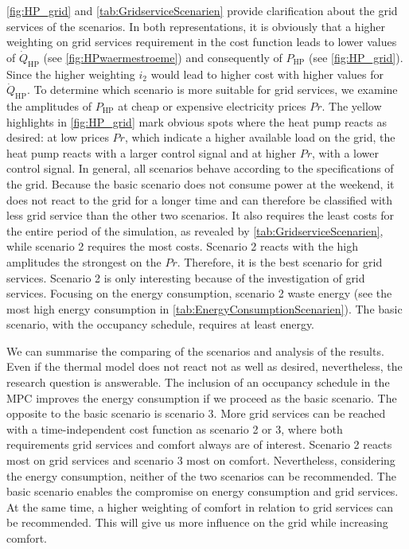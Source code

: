 \autoref{fig:HP_grid} and \autoref{tab:GridserviceScenarien} provide clarification about the grid services of the scenarios. In both representations, it is obviously that a higher weighting on grid services requirement in the cost function leads to lower values of $\dot{Q}_\text{HP}$ (see \autoref{fig:HPwaermestroeme}) and consequently of $P_\text{HP}$ (see \autoref{fig:HP_grid}). Since the higher weighting $i_\text{2}$ would lead to higher cost with higher values for $\dot{Q}_\text{HP}$. To determine which scenario is more suitable for grid services, we examine the amplitudes of $P_\text{HP}$ at cheap or expensive electricity prices $Pr$. The yellow highlights in \autoref{fig:HP_grid} mark obvious spots where the heat pump reacts as desired: at low prices $Pr$, which indicate a higher available load on the grid, the heat pump reacts with a larger control signal and at higher $Pr$, with a lower control signal. In general, all scenarios behave according to the specifications of the grid. Because the basic scenario does not consume power at the weekend, it does not react to the grid for a longer time and can therefore be classified with less grid service than the other two scenarios. It also requires the least costs for the entire period of the simulation, as revealed by \autoref{tab:GridserviceScenarien}, while scenario 2 requires the most costs. Scenario 2 reacts with the high amplitudes the strongest on the $Pr$. Therefore, it is the best scenario for grid services. Scenario 2 is only interesting because of the investigation of grid services. Focusing on the energy consumption, scenario 2 waste energy (see the most high energy consumption in \autoref{tab:EnergyConsumptionScenarien}). The basic scenario, with the occupancy schedule, requires at least energy. \newline

We can summarise the comparing of the scenarios and analysis of the results. Even if the thermal model does not react not as well as desired, nevertheless, the research question is answerable. The inclusion of an occupancy schedule in the MPC improves the energy consumption if we proceed as the basic scenario. The opposite to the basic scenario is scenario 3. More grid services can be reached with a time-independent cost function as scenario 2 or 3, where both requirements grid services and comfort always are of interest. Scenario 2 reacts most on grid services and scenario 3 most on comfort. Nevertheless, considering the energy consumption, neither of the two scenarios can be recommended. The basic scenario enables the compromise on energy consumption and grid services. At the same time, a higher weighting of comfort in relation to grid services can be recommended. This will give us more influence on the grid while increasing comfort.  

